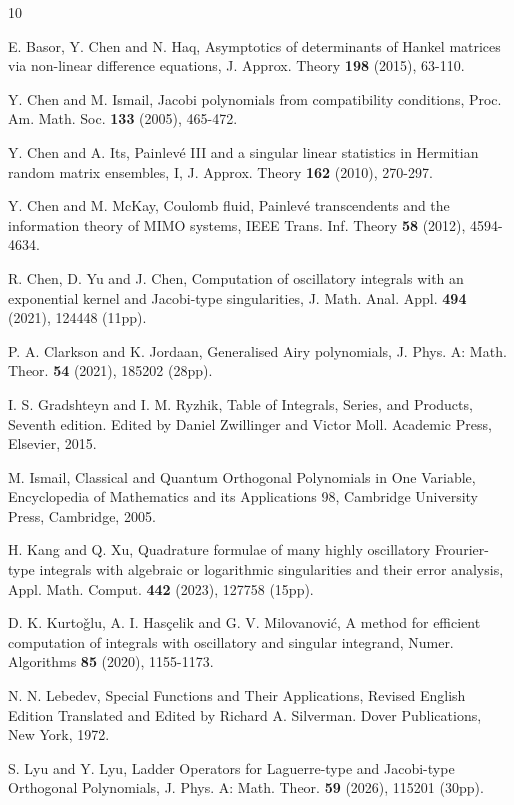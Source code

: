 \documentclass[11pt,a4paper]{article}
\numberwithin{equation}{section}
\begin{document}

\begin{thebibliography}{10}

E. Basor, Y. Chen and N. Haq, Asymptotics of determinants of Hankel matrices via non-linear difference equations, J. Approx. Theory {\bf 198} (2015), 63-110.

Y. Chen and M. Ismail, Jacobi polynomials from compatibility conditions, Proc. Am. Math. Soc. {\bf 133} (2005), 465-472.

Y. Chen and A. Its, Painlev\'{e} III and a singular linear statistics in Hermitian random matrix ensembles, I, J. Approx. Theory {\bf 162} (2010), 270-297.


Y. Chen and M. McKay, Coulomb fluid, Painlev\'{e} transcendents and the information theory of MIMO systems, IEEE Trans. Inf. Theory {\bf 58} (2012), 4594-4634.

R. Chen, D. Yu and J. Chen, Computation of oscillatory integrals with an exponential kernel
and Jacobi-type singularities, J. Math. Anal. Appl. {\bf 494} (2021), 124448 (11pp).

P. A. Clarkson and K. Jordaan, Generalised Airy polynomials, J. Phys. A: Math. Theor. {\bf 54} (2021), 185202 (28pp).

I. S. Gradshteyn and I. M. Ryzhik, Table of Integrals, Series, and Products, Seventh edition. Edited by Daniel Zwillinger and Victor Moll. Academic Press, Elsevier, 2015.

M. Ismail, Classical and Quantum Orthogonal Polynomials in One Variable, Encyclopedia of Mathematics and its Applications 98, Cambridge University Press, Cambridge, 2005.

H. Kang and Q. Xu, Quadrature formulae of many highly oscillatory Frourier-type integrals with algebraic or logarithmic singularities and their error analysis, Appl. Math. Comput. {\bf 442} (2023), 127758 (15pp).

D. K. Kurto\v{g}lu, A. I. Has\c{c}elik and G. V. Milovanovi\'c, A method for efficient computation of integrals with oscillatory and singular integrand, Numer. Algorithms {\bf 85} (2020), 1155-1173.

N. N. Lebedev, Special Functions and Their Applications, Revised English Edition Translated and Edited by Richard A. Silverman. Dover Publications, New York, 1972.


S. Lyu and Y. Lyu, Ladder Operators for Laguerre-type and Jacobi-type Orthogonal Polynomials, J. Phys. A: Math. Theor. {\bf 59} (2026), 115201 (30pp).


\end{thebibliography}
\end{document}
